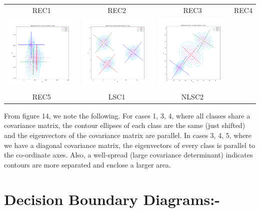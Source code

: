 \documentclass[11pt]{article}
\begin{document}
\begin{center}
\begin{tabular}{cccc}
  REC1 & REC2 & REC3 & REC4\\
  \includegraphics[width=4.5cm]{classifier/REAL_plots/EigenvectorContour_Case5.png}
  & \includegraphics[width=4.5cm]{classifier/LS_plots/EigenvectorContour_Case1.png}
  & \includegraphics[width=4.5cm]{classifier/NLS_plots/EigenvectorContour_Case2.png} \\
  REC5 & LSC1 & NLSC2\\
  \end{tabular}
\end{center}
From figure 14, we note the following. For cases 1, 3, 4, where all classes share a covariance matrix, the contour ellipses of each class are the same (just shifted) and the eigenvectors of the covariance matrix are parallel. In cases 3, 4, 5, where we have a diagonal covariance matrix, the eigenvectors of every class is parallel to the co-ordinate axes. Also, a well-spread (large covariance determinant) indicates contours are more separated and enclose a larger area.

\section*{Decision Boundary Diagrams:-}
\end{document}
